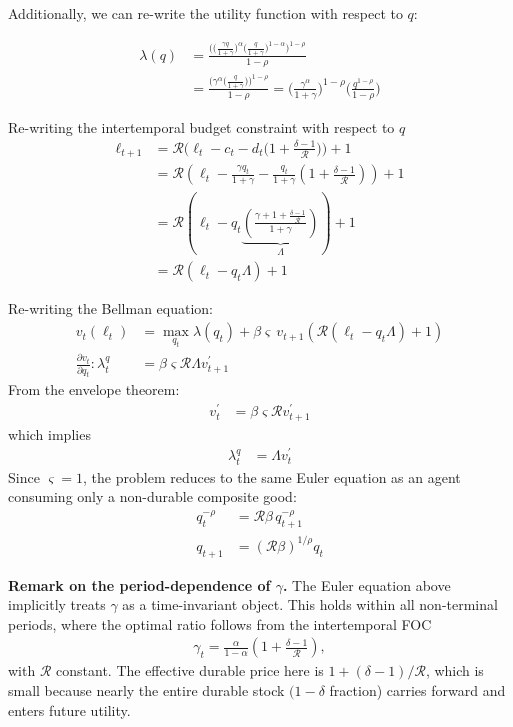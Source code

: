 \documentclass[\econtexMain]{subfiles}
\begin{document}
Additionally, we can re-write the utility function with respect to $q$:

\begin{align}
	\lambda(q) &= \frac{\Bigg( \Big(\frac{\gamma q}{1 + \gamma}  \Big)^{\alpha}  \Big( \frac{q}{1 + \gamma}  \Big)^{1-\alpha} \Bigg)^{1-\rho}}{1 - \rho}\\
	&= \frac{\Bigg( \gamma^{\alpha} \Big( \frac{q}{1 + \gamma}   \Big) \Bigg)^{1-\rho}}{1 - \rho} = \Big( \frac{\gamma^\alpha}{1 + \gamma} \Big)^{1 - \rho} \Big( \frac{q^{1 - \rho}}{1 - \rho}\Big)
\end{align}

Re-writing the intertemporal budget constraint with respect to $q$
\begin{align}
	\ell_{t+1} &= \mathcal{R}\Big(\ell_t - c_t - d_t \Big(1 + \frac{\delta - 1}{\mathcal{R}}\Big)\Big) + 1 \\
	&= \mathcal{R}\left(\ell_t - \frac{\gamma q_t}{1 + \gamma} - \frac{q_t}{1 + \gamma}\left(1 + \frac{\delta - 1}{\mathcal{R}}\right)\right) + 1\\
	&= \mathcal{R}\left(\ell_t - q_t \underbrace{\left(\frac{\gamma + 1 + \frac{\delta - 1}{\mathcal{R}}}{1 + \gamma} \right)}_{\Lambda} \right) + 1\\
	&=  \mathcal{R}(\ell_t - q_t \Lambda) + 1
\end{align}

Re-writing the Bellman equation:
\begin{align}
	v_t(\ell_t) &= \max_{q_t} \lambda(q_t) + \beta\varsigma\, v_{t+1}\left(\mathcal{R}(\ell_t - q_t \Lambda) + 1\right)\\
	\frac{\partial v_t}{\partial q_t}: \lambda_t^{q} &= \beta \varsigma \mathcal{R} \Lambda v^{'}_{t+1}
\end{align}
From the envelope theorem:
\begin{align}
	v^{'}_t &= \beta \varsigma \mathcal{R} v^{'}_{t+1}
\end{align}
which implies
\begin{align}
	\lambda_t^{q} &= \Lambda v^{'}_t 
\end{align}
Since $\varsigma = 1$, the problem reduces to the same Euler equation as an agent consuming only a non-durable composite good:
\begin{align}
	q_t^{-\rho} &= \mathcal{R}\beta\, q_{t+1}^{-\rho}\\
	q_{t+1} &= (\mathcal{R}\beta)^{1/\rho} q_t
\end{align}

\textbf{Remark on the period-dependence of $\gamma$.}\quad
The Euler equation above implicitly treats $\gamma$ as a time-invariant object.
This holds within all non-terminal periods, where the optimal ratio follows from
the intertemporal FOC
\begin{align}
	\gamma_t = \frac{\alpha}{1-\alpha}\left(1 + \frac{\delta - 1}{\mathcal{R}}\right),
\end{align}
with $\mathcal{R}$ constant.  The effective durable price here is
$1+(\delta-1)/\mathcal{R}$, which is small because nearly the entire durable
stock $(1-\delta$ fraction) carries forward and enters future utility.
\end{document}
